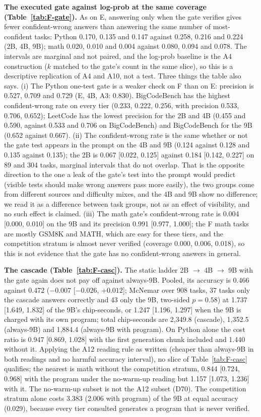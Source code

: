 \documentclass[11pt,a4paper]{article}
\begin{document}
\textbf{The executed gate against log-prob at the same coverage (Table~\ref{tab:F-gate}).} As on E, answering only when the gate verifies gives fewer confident-wrong answers than answering the same number of most-confident tasks: Python 0.170, 0.135 and 0.147 against 0.258, 0.216 and 0.224 (2B, 4B, 9B); math 0.020, 0.010 and 0.004 against 0.080, 0.094 and 0.078. The intervals are marginal and not paired, and the log-prob baseline is the A4 construction ($k$ matched to the gate's count in the same slice), so this is a descriptive replication of A4 and A10, not a test. Three things the table also says. (i) The Python one-test gate is a weaker check on F than on E: precision is 0.527, 0.709 and 0.729 (E, 4B, A3: 0.830). BigCodeBench has the highest confident-wrong rate on every tier (0.233, 0.222, 0.256, with precision 0.533, 0.706, 0.652); LeetCode has the lowest precision for the 2B and 4B (0.455 and 0.590, against 0.533 and 0.706 on BigCodeBench) and BigCodeBench for the 9B (0.652 against 0.667). (ii) The confident-wrong rate is the same whether or not the gate test appears in the prompt on the 4B and 9B (0.124 against 0.128 and 0.135 against 0.135); the 2B is 0.067 [0.022, 0.125] against 0.184 [0.142, 0.227] on 89 and 304 tasks, marginal intervals that do not overlap. That is the opposite direction to the one a leak of the gate's test into the prompt would predict (visible tests should make wrong answers pass more easily), the two groups come from different sources and difficulty mixes, and the 4B and 9B show no difference; we read it as a difference between task groups, not as an effect of visibility, and no such effect is claimed. (iii) The math gate's confident-wrong rate is 0.004 [0.000, 0.010] on the 9B and its precision 0.991 [0.977, 1.000]; the F math tasks are mostly GSM8K and MATH, which are easy for these tiers, and the competition stratum is almost never verified (coverage 0.000, 0.006, 0.018), so this is not evidence that the gate has no confident-wrong answers in general.

\textbf{The cascade (Table~\ref{tab:F-casc}).} The static ladder 2B $\to$ 4B $\to$ 9B with the gate again does not pay off against always-9B. Pooled, its accuracy is 0.466 against 0.472 ($-0.007$ [$-0.026$, $+0.012$]; McNemar over 908 tasks, 37 tasks only the cascade answers correctly and 43 only the 9B, two-sided $p=0.58$) at 1.737 [1.649, 1.832] of the 9B's chip-seconds, or 1.247 [1.196, 1.297] when the 9B is charged with its own program; total chip-seconds are 2,349.8 (cascade), 1,352.5 (always-9B) and 1,884.4 (always-9B with program). On Python alone the cost ratio is 0.947 [0.869, 1.028] with the first generation chunk included and 1.440 without it. Applying the A12 reading rule as written (cheaper than always-9B in both readings and no harmful accuracy interval), no slice of Table~\ref{tab:F-casc} qualifies; the nearest is math without the competition stratum, 0.844 [0.724, 0.968] with the program under the no-warm-up reading but 1.157 [1.073, 1.236] with it. The no-warm-up subset is not the A12 subset (D70). The competition stratum alone costs 3.383 (2.006 with program) of the 9B at equal accuracy (0.029), because every tier consulted generates a program that is never verified.
\end{document}

